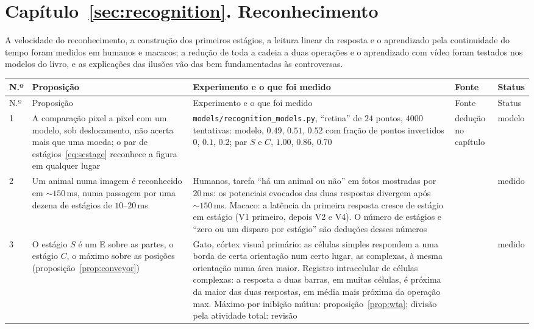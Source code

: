 \section{Capítulo~\ref{sec:recognition}. Reconhecimento}

A velocidade do reconhecimento, a construção dos primeiros estágios, a leitura linear da resposta e o aprendizado pela continuidade do tempo foram medidos em humanos e macacos; a redução de toda a cadeia a duas operações e o aprendizado com vídeo foram testados nos modelos do livro, e as explicações das ilusões vão das bem fundamentadas às controversas.

{\footnotesize
\setlength{\tabcolsep}{3pt}\renewcommand{\arraystretch}{1.15}
\begin{longtable}{>{\raggedright}p{0.5cm}>{\raggedright}p{4.0cm}>{\raggedright}p{5.6cm}>{\raggedright}p{2.3cm}>{\raggedright\arraybackslash}p{1.7cm}}
\toprule
N.º & Proposição & Experimento e o que foi medido & Fonte & Status \\
\midrule\endfirsthead
\toprule
N.º & Proposição & Experimento e o que foi medido & Fonte & Status \\
\midrule\endhead
1 & A comparação pixel a pixel com um modelo, sob deslocamento, não acerta mais que uma moeda; o par de estágios~\eqref{eq:scstage} reconhece a figura em qualquer lugar & \texttt{models/\allowbreak recognition\_models.py}, ``retina'' de $24$ pontos, $4000$ tentativas: modelo, $0.49$, $0.51$, $0.52$ com fração de pontos invertidos $0$, $0.1$, $0.2$; par $S$ e $C$, $1.00$, $0.86$, $0.70$ & dedução no capítulo & modelo \\
2 & Um animal numa imagem é reconhecido em $\sim150$\,ms, numa passagem por uma dezena de estágios de $10$--$20$\,ms & Humanos, tarefa ``há um animal ou não'' em fotos mostradas por $20$\,ms: os potenciais evocados das duas respostas divergem após $\sim150$\,ms. Macaco: a latência da primeira resposta cresce de estágio em estágio (V1 primeiro, depois V2 e V4). O número de estágios e ``zero ou um disparo por estágio'' são deduções desses números & \cite{Thorpe1996,Schmolesky1998} & medido \\
3 & O estágio $S$ é um E sobre as partes, o estágio $C$, o máximo sobre as posições (proposição~\ref{prop:conveyor}) & Gato, córtex visual primário: as células simples respondem a uma borda de certa orientação num certo lugar, as complexas, à mesma orientação numa área maior. Registro intracelular de células complexas: a resposta a duas barras, em muitas células, é próxima da maior das duas respostas, em média mais próxima da operação max. Máximo por inibição mútua: proposição~\ref{prop:wta}; divisão pela atividade total: revisão & \cite{HubelWiesel1962,Lampl2004,Carandini2012} & medido \\

\end{longtable}}
